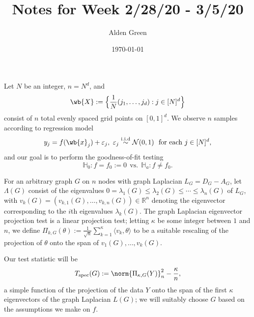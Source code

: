 \documentclass{article}
\newcommand{\Reals}{\mathbb{R}}
\newcommand{\1}{\mathbf{1}}
\newcommand{\dotp}[2]{\langle #1, #2 \rangle}
\theoremstyle{alden}
\theoremstyle{aldenthm}
\theoremstyle{definition}
\theoremstyle{remark}
\begin{document}
\title{Notes for Week 2/28/20 - 3/5/20}
\author{Alden Green}
\date{\today}
\maketitle

Let $N$ be an integer, $n = N^d$, and 
\begin{equation*}
\wb{X} := \Bigl\{\frac{1}{N}(j_1,\ldots,j_d): j \in [N]^d\Bigr\}
\end{equation*}
consist of $n$ total evenly spaced grid points on $[0,1]^d$. We observe $n$ samples according to regression model
\begin{equation}
\label{eqn:grid_regression_model}
y_j = f(\wb{x}_j) + \varepsilon_j, ~\varepsilon_j \overset{\mathrm{i.i.d}}{\sim} \mathcal{N}(0,1) ~~\textrm{for each $j \in [N]^d$,}
\end{equation}
and our goal is to perform the goodness-of-fit testing
\begin{equation*}
\mathbb{H}_0 : f = f_0 := 0 ~~\textrm{vs.}~~ \mathbb{H}_a: f \neq f_0.
\end{equation*}

For an arbitrary graph $G$ on $n$ nodes with graph Laplacian $L_G = D_G - A_G$, let $\Lambda(G)$ consist of the eigenvalues $0 = \lambda_1(G) \leq \lambda_2(G) \leq \cdots \leq \lambda_n(G)$ of $L_G$, with $v_k(G) = (v_{k,1}(G),\ldots,v_{k,n}(G)) \in \Reals^n$ denoting the eigenvector corresponding to the $i$th eigenvalues $\lambda_k(G)$. The graph Laplacian eigenvector projection test is a linear projection test; letting $\kappa$ be some integer between $1$ and $n$, we define $\Pi_{k,G}(\theta) := \frac{1}{\sqrt{n}}\sum_{k = 1}^{\kappa} \dotp{v_k}{\theta}$ to be a suitable rescaling of the projection of $\theta$ onto the span of $v_1(G),\ldots,v_k(G)$. 

Our test statistic will be
\begin{equation*}
T_{\mathrm{spec}}(G) := \norm{\Pi_{\kappa,G}(Y)}_n^2 - \frac{\kappa}{n},
\end{equation*}
a simple function of the projection of the data $Y$ onto the span of the first $\kappa$ eigenvectors of the graph Laplacian $L(G)$; we will suitably choose $G$ based on the assumptions we make on $f$.
\end{document}
